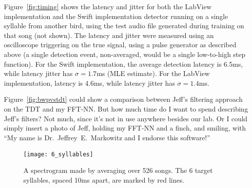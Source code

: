 \documentclass{article}
\newcommand\fig[1]{Figure~\ref{#1}}
\let\oldmarginpar\marginpar
\renewcommand\marginpar[1]{\-\oldmarginpar[\raggedleft\footnotesize #1]
  {\raggedright\footnotesize #1}}
\begin{document}
\fig{fig:timing} shows the latency and jitter for both the LabView
implementation and the Swift implementation detector running on a
single syllable from another bird, using the test audio file generated
during training on that song (not shown).  The latency and jitter were
measured using an oscilloscope triggering on the true signal, using a pulse generator as
described above (a single detection event, non-averaged, would be a
single low-to-high step function). For the Swift implementation, the
average detection latency is 6.5ms, while latency jitter has $\sigma = 1.7$ms
(MLE estimate). For the LabView implementation, latency is 4.6ms, while latency 
jitter has $\sigma = 1.4$ms.

\fig{fig:bwpvstdt} could show\marginpar{FIXME} a comparison between Jeff's filtering approach on the TDT and my FFT-NN. But how much time do I want to spend describing Jeff's filters? Not much, since it's not in use anywhere besides our lab. Or I could simply insert a photo of Jeff, holding my FFT-NN and a finch, and smiling, with ``My name is Dr.~Jeffrey~E.~Markowitz and I endorse this software!''

\begin{figure}
  \texttt{[image: 6\_syllables]}
  \caption{A spectrogram made by averaging over 526 songs. The 6
    target syllables, spaced 10ms apart, are marked by red lines.}
    \label{fig:sixsyllables}
\end{figure}
\end{document}
